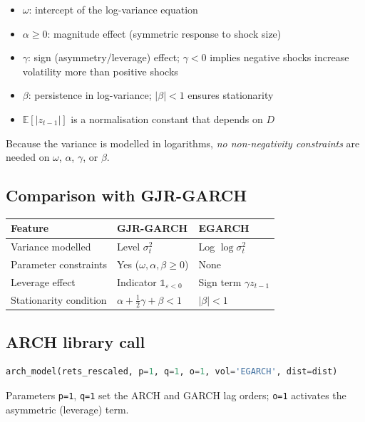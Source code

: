 \documentclass[11pt, a4paper]{article}
\begin{document}
\begin{itemize}
  \item $\omega$: intercept of the log-variance equation
  \item $\alpha \geq 0$: magnitude effect (symmetric response to shock size)
  \item $\gamma$: sign (asymmetry/leverage) effect;
        $\gamma < 0$ implies negative shocks increase volatility more than
        positive shocks
  \item $\beta$: persistence in log-variance; $|\beta| < 1$ ensures stationarity
  \item $\mathbb{E}[|z_{t-1}|]$ is a normalisation constant that depends on $D$
\end{itemize}

Because the variance is modelled in logarithms, \textit{no non-negativity
constraints} are needed on $\omega$, $\alpha$, $\gamma$, or $\beta$.

\subsection{Comparison with GJR-GARCH}

\begin{tabular}{lll}
\toprule
Feature & GJR-GARCH & EGARCH \\
\midrule
Variance modelled & Level $\sigma_t^2$ & Log $\log\sigma_t^2$ \\
Parameter constraints & Yes ($\omega, \alpha, \beta \geq 0$) & None \\
Leverage effect & Indicator $\mathbb{1}_{\varepsilon<0}$ & Sign term $\gamma z_{t-1}$ \\
Stationarity condition & $\alpha + \frac{1}{2}\gamma + \beta < 1$ & $|\beta| < 1$ \\
\bottomrule
\end{tabular}

\subsection{ARCH library call}

\begin{lstlisting}[language=Python]
arch_model(rets_rescaled, p=1, q=1, o=1, vol='EGARCH', dist=dist)
\end{lstlisting}
Parameters \texttt{p=1}, \texttt{q=1} set the ARCH and GARCH lag orders;
\texttt{o=1} activates the asymmetric (leverage) term.

\end{document}
